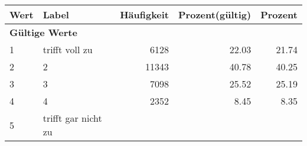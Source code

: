      \begin{longtable}{lXrrr}
     \toprule
     \textbf{Wert} & \textbf{Label} & \textbf{Häufigkeit} & \textbf{Prozent(gültig)} & \textbf{Prozent} \\
     \endhead
     \midrule
     \multicolumn{5}{l}{\textbf{Gültige Werte}}\\

     1 &
     \multicolumn{1}{X}{ trifft voll zu   } &


       \num{6128} &
       \num[round-mode=places,round-precision=2]{22.03} &
         \num[round-mode=places,round-precision=2]{21.74} \\

     2 &
     \multicolumn{1}{X}{ 2   } &


       \num{11343} &
       \num[round-mode=places,round-precision=2]{40.78} &
         \num[round-mode=places,round-precision=2]{40.25} \\

     3 &
     \multicolumn{1}{X}{ 3   } &


       \num{7098} &
       \num[round-mode=places,round-precision=2]{25.52} &
         \num[round-mode=places,round-precision=2]{25.19} \\

     4 &
     \multicolumn{1}{X}{ 4   } &


       \num{2352} &
       \num[round-mode=places,round-precision=2]{8.45} &
         \num[round-mode=places,round-precision=2]{8.35} \\

     5 &
     \multicolumn{1}{X}{ trifft gar nicht zu   } &



\end{longtable}
